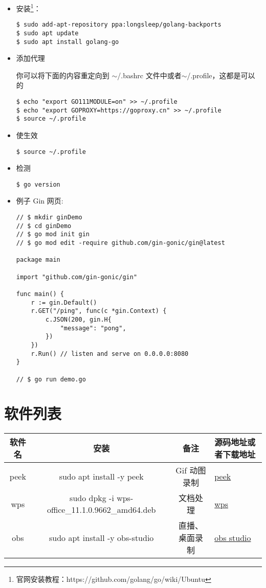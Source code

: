 \begin{itemize}
\item 安装\footnote{官网安装教程：https://github.com/golang/go/wiki/Ubuntu}：
\begin{lstlisting}
$ sudo add-apt-repository ppa:longsleep/golang-backports
$ sudo apt update
$ sudo apt install golang-go
\end{lstlisting}
	
\item 添加代理

你可以将下面的内容重定向到 $\sim$/.bashrc 文件中或者$\sim$/.profile，这都是可以的
\begin{lstlisting}
$ echo "export GO111MODULE=on" >> ~/.profile
$ echo "export GOPROXY=https://goproxy.cn" >> ~/.profile
$ source ~/.profile
\end{lstlisting}

\item 使生效
\begin{lstlisting}
$ source ~/.profile
\end{lstlisting}
	
\item 检测
\begin{lstlisting}
$ go version
\end{lstlisting}

\item 例子 Gin 网页: 

\begin{lstlisting}
// $ mkdir ginDemo
// $ cd ginDemo 
// $ go mod init gin	
// $ go mod edit -require github.com/gin-gonic/gin@latest	
	
package main

import "github.com/gin-gonic/gin"

func main() {
	r := gin.Default()
	r.GET("/ping", func(c *gin.Context) {
		c.JSON(200, gin.H{
			"message": "pong",
		})
	})
	r.Run() // listen and serve on 0.0.0.0:8080
}

// $ go run demo.go 
\end{lstlisting}
\end{itemize}

\section{软件列表}
\begin{tabular}{|c|c|c|p{3cm}|}
	\hline
	软件名 & 安装 & 备注 & 源码地址或者下载地址\\
	\hline
	peek &  sudo apt install -y peek & Gif 动图录制 & \href{https://github.com/phw/peek}{peek}\\      
	\hline
	wps & sudo dpkg -i wps-office\_11.1.0.9662\_amd64.deb & 文档处理 & \href{https://linux.wps.cn/}{wps}\\      
	\hline
	obs & sudo apt install -y obs-studio & 直播、桌面录制&\href{https://obsproject.com/}{obs studio}\\
	\hline
\end{tabular}